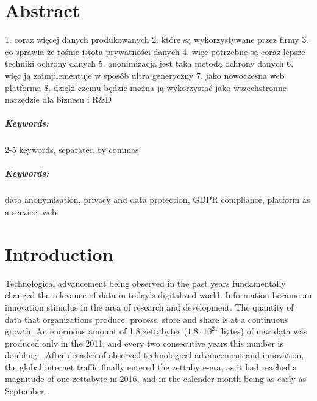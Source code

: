 \documentclass[a4paper,twoside,12pt]{book}
\newcounter{PagesWithoutNumbers}
\begin{document}
\cleardoublepage
 

\rmfamily
\normalfont



\pagestyle{onlyPageNumbers}
\tableofcontents

\setcounter{PagesWithoutNumbers}{\value{page}}
\mainmatter
\pagestyle{empty}

\chapter*{Abstract}

1. coraz więcej danych produkowanych
2. które są wykorzystywane przez firmy
3. co sprawia że rośnie istota prywatności danych
4. więc potrzebne są coraz lepsze techniki ochrony danych
5. anonimizacja jest taką metodą ochrony danych
6. więc ją zaimplementuje w sposób ultra generyczny
7. jako nowoczesna web platforma
8. dzięki czemu będzie można ją wykorzystać jako wszechstronne narzędzie dla biznesu i R\&D

\paragraph{Keywords:} 2-5 keywords, separated by commas

\paragraph{Keywords:} data anonymisation, privacy and data protection, GDPR compliance, platform as a service, web



\cleardoublepage


\pagestyle{PageNumbersChapterTitles}



\chapter{Introduction}

Technological advancement being observed in the past years fundamentally changed the relevance of data in today's digitalized world. Information became an innovation stimulus in the area of research and development. The quantity of data that organizations produce, process, store and share is at a continuous growth. An enormous amount of 1.8 zettabytes ($1.8 \cdot 10^{21}$ bytes) of new data was produced only in the 2011, and every two consecutive years this number is doubling \cite{bib:big_data_security}. After decades of observed technological advancement and innovation, the global internet traffic finally entered the zettabyte-era, as it had reached a magnitude of one zettabyte in 2016, and in the calender month being as early as September \cite{bib:cisco_blog}.
\end{document}
